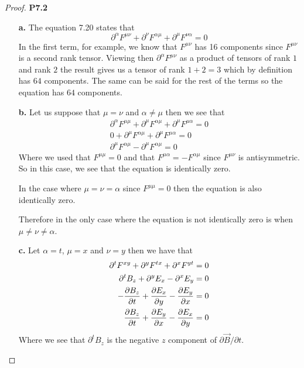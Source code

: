 \documentclass[11pt]{article}
\theoremstyle{definition}
\begin{document}
\begin{proof}{\textbf{P7.2}}
\begin{itemize}
    \item [\textbf{a.}] The equation 7.20 states that
    $$\partial^\alpha F^{\mu\nu} + \partial^\nu F^{\alpha\mu}
    + \partial^\mu F^{\nu\alpha} = 0$$
    In the first term, for example, we know that $F^{\mu\nu}$ has 16 components
    since $F^{\mu\nu}$ is a second rank tensor.
    Viewing then $\partial^\alpha F^{\mu\nu}$ as a product of tensors of rank
    $1$ and rank $2$ the result gives us a tensor of rank $1 + 2 = 3$ which
    by definition has $64$ components.
    The same can be said for the rest of the terms so the equation has $64$
    components.

    \item[\textbf{b.}] Let us suppose that $\mu = \nu$ and $\alpha \neq \mu$
    then we see that
    \begin{align*}
        \partial^\alpha F^{\mu\mu} + \partial^\mu F^{\alpha\mu}
        + \partial^\mu F^{\mu\alpha} = 0\\
        0 + \partial^\mu F^{\alpha\mu}
        + \partial^\mu F^{\mu\alpha} = 0\\
        \partial^\mu F^{\alpha\mu}
        - \partial^\mu F^{\alpha\mu} = 0
    \end{align*}
    Where we used that $F^{\mu\mu} = 0$ and that
    $F^{\mu\alpha} = - F^{\alpha\mu}$ since $F^{\mu\nu}$ is antisymmetric.
    So in this case, we see that the equation is identically zero.

    In the case where $\mu = \nu = \alpha$ since $F^{\mu\mu} = 0$ then
    the equation is also identically zero.

    Therefore in the only case where the equation is not identically zero
    is when $\mu \neq \nu \neq \alpha$.

    \item[\textbf{c.}] Let $\alpha = t$, $\mu = x$ and $\nu = y$ then we have
    that
    \begin{align*}
        \partial^t F^{xy} + \partial^y F^{tx} + \partial^x F^{yt} &= 0\\
        \partial^t B_z + \partial^y E_x - \partial^x E_y &= 0\\
        -\partialderivative{B_z}{t} + \partialderivative{E_x}{y}
        - \partialderivative{E_y}{x} &= 0\\
        \partialderivative{B_z}{t} + \partialderivative{E_y}{x}
        - \partialderivative{E_x}{y}&= 0
    \end{align*}
    Where we see that $\partial^t B_z$ is the negative $z$ component of
    $\partial \vec{B} / \partial t$.


\end{itemize}
\end{proof}
\end{document}

